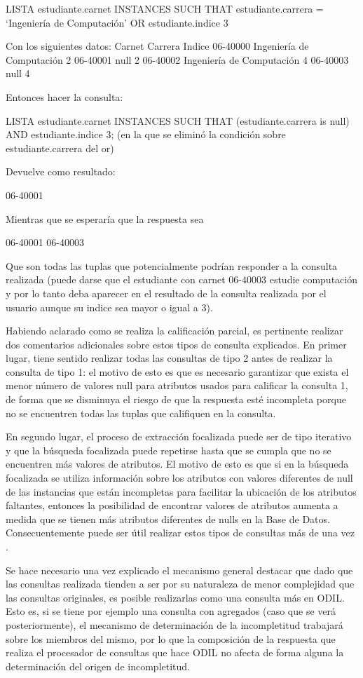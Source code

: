 LISTA estudiante.carnet INSTANCES
SUCH THAT estudiante.carrera = ‘Ingeniería de Computación’ OR estudiante.indice  3

	Con los siguientes datos:
Carnet
Carrera
Indice
06-40000
Ingeniería de Computación
2
06-40001
null
2
06-40002
Ingeniería de Computación
4
06-40003
null
4



	Entonces hacer la consulta:

LISTA estudiante.carnet INSTANCES
SUCH THAT (estudiante.carrera  is null) AND estudiante.indice  3; (en la que se eliminó la condición sobre estudiante.carrera del or)

	Devuelve como resultado:

06-40001

	Mientras que se esperaría que la respuesta sea

06-40001
06-40003

	Que son todas las tuplas que potencialmente podrían responder a la consulta realizada (puede darse que el estudiante con carnet 06-40003 estudie computación y por lo tanto deba aparecer en el resultado de la consulta realizada por el usuario aunque su indice sea mayor o igual a 3).

Habiendo aclarado como se realiza la calificación parcial, es pertinente realizar dos comentarios adicionales sobre estos tipos de consulta explicados. En primer lugar, tiene sentido realizar todas las consultas de tipo 2 antes de realizar la consulta de tipo 1: el motivo de esto es que es necesario garantizar que exista el menor número de valores null para atributos usados para calificar la consulta 1, de forma que se disminuya el riesgo de que la respuesta esté incompleta porque no se encuentren todas las tuplas que califiquen en la consulta.

	En segundo lugar, el proceso de extracción focalizada puede ser de tipo iterativo y que la búsqueda focalizada puede repetirse hasta que se cumpla que no se encuentren más valores de atributos. El motivo de esto es que si en la búsqueda focalizada se utiliza información sobre los atributos con valores diferentes de null de las instancias que están incompletas para facilitar la ubicación de los atributos faltantes, entonces la posibilidad de encontrar valores de atributos aumenta a medida que se tienen más atributos diferentes de nulls en la Base de Datos. Consecuentemente puede ser útil realizar estos tipos de consultas más de una vez .

Se hace necesario una vez explicado el mecanismo general destacar que dado que las consultas realizada tienden a ser por su naturaleza de menor complejidad que las consultas originales, es posible realizarlas como una consulta más en ODIL. Esto es, si se tiene por ejemplo una consulta con agregados (caso que se verá posteriormente), el mecanismo de determinación de la incompletitud trabajará sobre los miembros del mismo, por lo que la composición de la respuesta que realiza el procesador de consultas que hace ODIL no afecta de forma alguna la determinación del origen de incompletitud.


